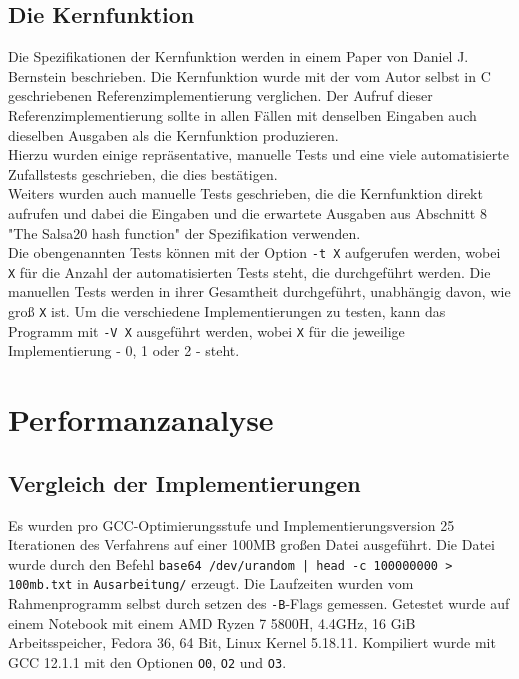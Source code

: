\documentclass[course=erap]{aspdoc}
\begin{document}
\subsection{Die Kernfunktion}
Die Spezifikationen der Kernfunktion werden in einem Paper von Daniel J. Bernstein beschrieben. \cite{salsa20specification}
Die Kernfunktion wurde mit der vom Autor selbst in C geschriebenen Referenzimplementierung verglichen. \cite{salsa20}
Der Aufruf dieser Referenzimplementierung sollte in allen Fällen mit denselben Eingaben auch dieselben Ausgaben
als die Kern\-funk\-tion produzieren. 
\\Hierzu wurden einige repräsentative, manuelle Tests und eine viele automatisierte Zufallstests 
geschrieben, die dies bestätigen.
\\Weiters wurden auch manuelle Tests geschrieben, die die Kernfunktion direkt aufrufen und dabei 
die Eingaben und die erwartete Ausgaben aus Abschnitt 8 "The Salsa20 hash function" der Spezifikation 
verwenden. \cite{salsa20specification}
\\Die obengenannten Tests können mit der Option \texttt{-t X} aufgerufen werden, wobei \texttt{X} für die Anzahl der automatisierten 
Tests steht, die durchgeführt werden. Die manuellen Tests werden in ihrer Gesamtheit durchgeführt, unabhängig davon, 
wie groß \texttt{X} ist. Um die verschiedene Implementierungen zu testen, kann das Programm mit \texttt{-V X} ausgeführt werden, 
wobei \texttt{X} für die jeweilige Implementierung - 0, 1 oder 2 - steht.


\section{Performanzanalyse} \label{perf}
\subsection{Vergleich der Implementierungen}
Es wurden pro GCC-Optimierungsstufe und Implementierungsversion 25 
Iterationen des Verfahrens auf einer 100MB großen Datei ausgeführt. Die Datei
wurde durch den Befehl \texttt{base64 /dev/urandom | head -c 100000000 > 100mb.txt}
in \texttt{Ausarbeitung/} er\-zeugt.
Die Laufzeiten wurden vom Rahmenprogramm selbst durch setzen des \texttt{-B}-Flags
gemessen. Getestet wurde auf einem Notebook mit einem AMD Ryzen 7 5800H, 
4.4GHz, 16 GiB Arbeitsspeicher, Fedora 36, 64 Bit, Linux Kernel 5.18.11.
Kompiliert wurde mit GCC 12.1.1 mit den Optionen \texttt{O0}, \texttt{O2} und \texttt{O3}.
\end{document}

